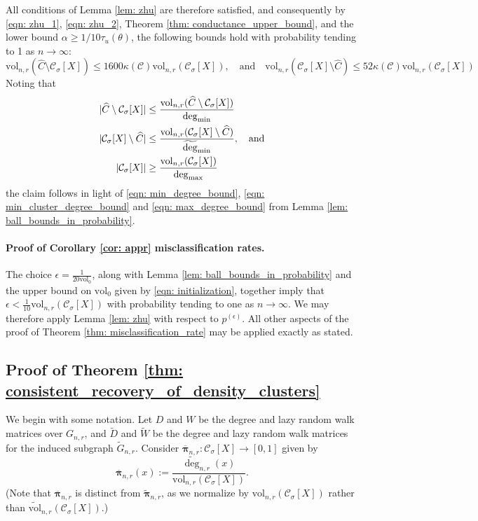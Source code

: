 \documentclass{article}
\DeclarePairedDelimiter\abs{\lvert}{\rvert}
\newcommand{\vol}{\mathrm{vol}}
\newcommand{\1}{\mathbf{1}}
\newcommand{\pbf}{p}        %
\newcommand{\pibf}{\bm{\pi}}
\newcommand{\Xbf}{X}             %
\newcommand{\Wbf}{W}
\newcommand{\Dbf}{D}
\newcommand{\Cset}{\mathcal{C}}
\newcommand{\Csig}{\Cset_{\sigma}}
\newcommand{\degminwt}{\widetilde{\deg}_{\min}}
\newcommand{\degmax}{\deg_{\max}}
\newcommand{\degmin}{\deg_{\min}}
\theoremstyle{aldenthm}
\theoremstyle{aldenrmrk}
\begin{document}
All conditions of Lemma \ref{lem: zhu} are therefore satisfied, and consequently by \eqref{eqn: zhu_1}, \eqref{eqn: zhu_2}, Theorem \ref{thm: conductance_upper_bound}, and the lower bound $\alpha \geq 1/10\tau_u(\theta)$, the following bounds hold with probability tending to 1 as $n \to \infty$:
\begin{equation*}
\vol_{n,r}(\widehat{C} \setminus \Csig[\Xbf]) \leq 1600 \kappa(\Cset) \vol_{n,r}(\Csig[\Xbf]), \quad \textrm{and} \quad  \vol_{n,r}(\Csig[\Xbf] \setminus \widehat{C}) \leq 52 \kappa(\Cset) \vol_{n,r}(\Csig[\Xbf])
\end{equation*}
Noting that
\begin{align*}
\abs{\widehat{C} \setminus \Csig[\Xbf]} & \leq \frac{\vol_{n,r}(\widehat{C} \setminus \Csig[\Xbf])}{\degmin}   \\
\abs{\Csig[\Xbf] \setminus \widehat{C}} & \leq \frac{\vol_{n,r}(\Csig[\Xbf] \setminus \widehat{C})}{\degminwt}, \quad \textrm{and} \\
\abs{\Csig[\Xbf]} & \geq \frac{\vol_{n,r}(\Csig[\Xbf])}{\degmax}
\end{align*}
the claim follows in light of \eqref{eqn: min_degree_bound}, \eqref{eqn: min_cluster_degree_bound} and \eqref{eqn: max_degree_bound} from Lemma \ref{lem: ball_bounds_in_probability}.

\paragraph{Proof of Corollary \ref{cor: appr} misclassification rates.}

The choice $\epsilon = \frac{1}{20 \vol_0}$, along with Lemma \ref{lem: ball_bounds_in_probability} and the upper bound on $\vol_0$ given by \eqref{eqn: initialization}, together imply that $\epsilon < \frac{1}{10}\vol_{n,r}(\Csig[\Xbf])$ with probability tending to one as $n \to \infty$. We may therefore apply Lemma \ref{lem: zhu} with respect to $\pbf^{(\epsilon)}$. All other aspects of the proof of Theorem \ref{thm: misclassification_rate} may be applied exactly as stated.



\subsection{Proof of Theorem \ref{thm: consistent_recovery_of_density_clusters}}
\label{sec: proof_of_consistent_cluster_recovery}

We begin with some notation. Let $\Dbf$ and $\Wbf$ be the degree and lazy random walk matrices over $G_{n,r}$, and $\widetilde{\Dbf}$ and $\widetilde{\Wbf}$ be the degree and lazy random walk matrices for the induced subgraph $\widetilde{G}_{n,r}$. Consider $\overline{\pibf}_{n,r}: \Csig[\Xbf] \to [0,1]$ given by
\begin{equation*}
\overline{\pibf}_{n,r}(x) := \frac{\widetilde{\deg}_{n,r}(x)}{\vol_{n,r}(\Csig[\Xbf])}.
\end{equation*}
(Note that $\overline{\pibf}_{n,r}$ is distinct from $\widetilde{\pibf}_{n,r}$, as we normalize by $\vol_{n,r}(\Csig[\Xbf])$ rather than $\widetilde{\vol}_{n,r}(\Csig[\Xbf])$.)
\end{document}
